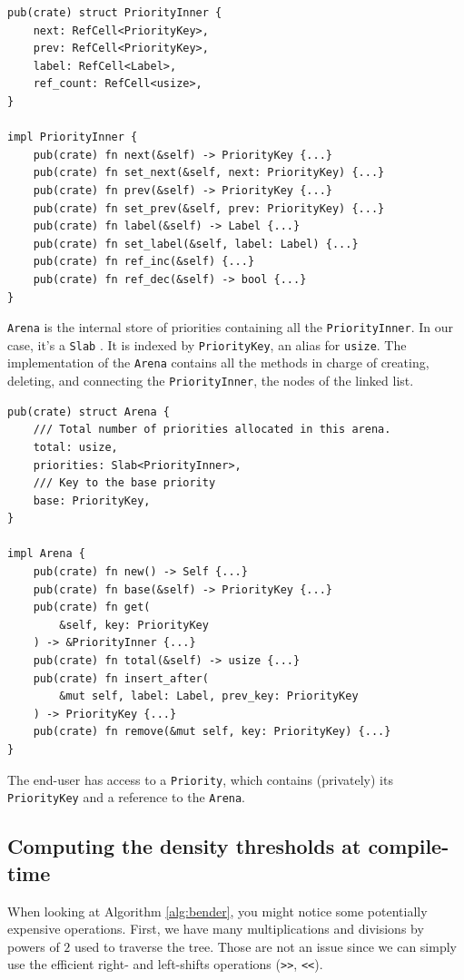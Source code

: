\documentclass[12pt]{article}
\begin{document}
\begin{lstlisting}
pub(crate) struct PriorityInner {
    next: RefCell<PriorityKey>,
    prev: RefCell<PriorityKey>,
    label: RefCell<Label>,
    ref_count: RefCell<usize>,
}

impl PriorityInner {
    pub(crate) fn next(&self) -> PriorityKey {...}
    pub(crate) fn set_next(&self, next: PriorityKey) {...}
    pub(crate) fn prev(&self) -> PriorityKey {...}
    pub(crate) fn set_prev(&self, prev: PriorityKey) {...}
    pub(crate) fn label(&self) -> Label {...}
    pub(crate) fn set_label(&self, label: Label) {...}
    pub(crate) fn ref_inc(&self) {...}
    pub(crate) fn ref_dec(&self) -> bool {...}
}
\end{lstlisting}

\lstinline{Arena} is the internal store of priorities containing all the \lstinline{PriorityInner}. In our case, it's a \lstinline{Slab} \cite{slab-crate}. It is indexed by \lstinline{PriorityKey}, an alias for \lstinline{usize}. The implementation of the \lstinline{Arena} contains all the methods in charge of creating, deleting, and connecting the \lstinline{PriorityInner}, the nodes of the linked list.

\begin{lstlisting}
pub(crate) struct Arena {
    /// Total number of priorities allocated in this arena.
    total: usize,
    priorities: Slab<PriorityInner>,
    /// Key to the base priority
    base: PriorityKey,
}

impl Arena {
    pub(crate) fn new() -> Self {...}
    pub(crate) fn base(&self) -> PriorityKey {...}
    pub(crate) fn get(
        &self, key: PriorityKey
    ) -> &PriorityInner {...}
    pub(crate) fn total(&self) -> usize {...}
    pub(crate) fn insert_after(
        &mut self, label: Label, prev_key: PriorityKey
    ) -> PriorityKey {...}
    pub(crate) fn remove(&mut self, key: PriorityKey) {...}
}
\end{lstlisting}

The end-user has access to a \lstinline{Priority}, which contains (privately) its \lstinline{PriorityKey} and a reference to the \lstinline{Arena}.

\subsection{Computing the density thresholds at compile-time} \label{precompute}

When looking at Algorithm \ref{alg:bender}, you might notice some potentially expensive operations.
First, we have many multiplications and divisions by powers of $2$ used to traverse the tree. Those are not an issue since we can simply use the efficient right- and left-shifts operations (\texttt{>>}, \texttt{<<}).
\end{document}
